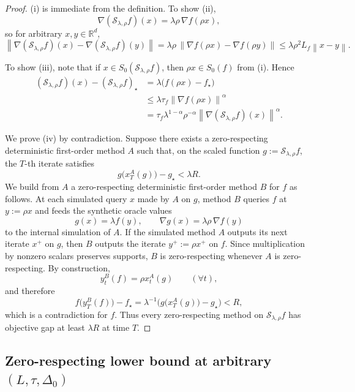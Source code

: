 \documentclass[11pt]{article}
\newcommand{\R}{\mathbb{R}}
\newcommand{\norm}[1]{\left\lVert #1\right\rVert}
\begin{document}
\begin{proof}
 (i) is immediate from the definition. To show (ii),
\[
\nabla(\mathcal S_{\lambda,\rho}f)(x)=\lambda\rho\,\nabla f(\rho x),
\]
so for arbitrary $x,y\in \R^d$,
\[
\norm{\nabla(\mathcal S_{\lambda,\rho}f)(x)-\nabla(\mathcal S_{\lambda,\rho}f)(y)}
=
\lambda\rho\,\norm{\nabla f(\rho x)-\nabla f(\rho y)}
\le
\lambda\rho^2L_f\norm{x-y}.
\]

To show (iii), note that if $x\in S_0(\mathcal S_{\lambda,\rho}f)$, then $\rho x\in S_0(f)$ from (i). Hence
\[
\begin{aligned}
(\mathcal S_{\lambda,\rho}f)(x)-(\mathcal S_{\lambda,\rho}f)_\star
&=
\lambda\bigl(f(\rho x)-f_\star\bigr)\\
&\le
\lambda\tau_f\norm{\nabla f(\rho x)}^\alpha\\
&=
\tau_f\lambda^{1-\alpha}\rho^{-\alpha}
\norm{\nabla(\mathcal S_{\lambda,\rho}f)(x)}^\alpha.
\end{aligned}
\]

We prove (iv) by contradiction.
Suppose there exists a zero-respecting deterministic first-order method $A$ such that, on the scaled function $g:=\mathcal S_{\lambda,\rho}f$, the $T$-th iterate satisfies
\[
g\bigl(x_T^A(g)\bigr)-g_\star<\lambda R.
\]
We build from \(A\) a zero-respecting deterministic first-order method \(B\) for \(f\) as follows.
At each simulated query \(x\) made by \(A\) on \(g\), method \(B\) queries \(f\) at \(y:=\rho x\) and feeds the synthetic oracle values
\[
g(x)=\lambda f(y),
\qquad
\nabla g(x)=\lambda\rho\,\nabla f(y)
\]
to the internal simulation of $A$.
If the simulated method $A$ outputs its next iterate $x^+$ on $g$, then $B$ outputs the iterate $y^+:=\rho x^+$ on $f$.
Since multiplication by nonzero scalars preserves supports, $B$ is zero-respecting whenever $A$ is zero-respecting.
By construction,
\[
y_t^B(f)=\rho x_t^A(g)
\qquad (\forall t),
\]
and therefore
\[
f\bigl(y_T^B(f)\bigr)-f_\star
=
\lambda^{-1}\bigl(g\bigl(x_T^A(g)\bigr)-g_\star\bigr)
<
R,
\]
which is a contradiction for $f$.
Thus every zero-respecting method on $\mathcal S_{\lambda,\rho}f$ has objective gap at least $\lambda R$ at time $T$.
\end{proof}

\subsection{\texorpdfstring{Zero-respecting lower bound at arbitrary $(L,\tau,\Delta_0)$}{Zero-respecting lower bound at arbitrary (L,tau,Delta0)}}
\label{app:det-zr}
\end{document}
